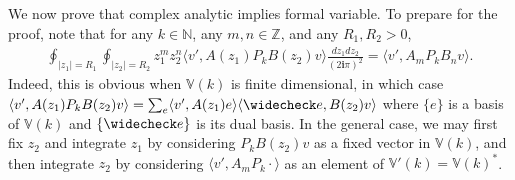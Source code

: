 \documentclass[11pt,b5paper,notitlepage]{article}
\theoremstyle{definition}
\theoremstyle{plain}
\newcommand{\wch}{\widecheck}
\newcommand{\bk}[1]{\langle {#1}\rangle}
\newcommand{\im}{\mathbf{i}}
\newcommand{\Vbb}{\mathbb V}
\newcommand{\Nbb}{\mathbb N}
\newcommand{\Zbb}{\mathbb Z}
\numberwithin{equation}{section}
\begin{document}
\subsection{}\label{lb69}

We now prove that complex analytic implies formal variable. To prepare for the proof, note that for any $k\in\Nbb$, any $m,n\in\Zbb$, and any $R_1,R_2>0$,
\begin{align}
	\oint_{|z_1|=R_1}\oint_{|z_2|=R_2}z_1^mz_2^n\bk{v',A(z_1)P_kB(z_2)v}\frac {dz_1dz_2}{(2\im\pi)^2}=\bk{v',A_mP_kB_nv}.\label{eq101}
\end{align}
Indeed, this is obvious when $\Vbb(k)$ is finite dimensional, in which case $\bk{v',A(z_1)P_kB(z_2)v}=\sum_e \bk{v',A(z_1)e}\bk{\wch e,B(z_2)v}$ where $\{e\}$ is a basis of $\Vbb(k)$ and $\{\wch e\}$ is its dual basis. In the general case, we may first fix $z_2$ and integrate $z_1$ by considering $P_kB(z_2)v$ as a fixed vector in $\Vbb(k)$, and then integrate $z_2$ by considering $\bk{v',A_mP_k \cdot}$ as an element of $\Vbb'(k)=\Vbb(k)^*$.
\end{document}
